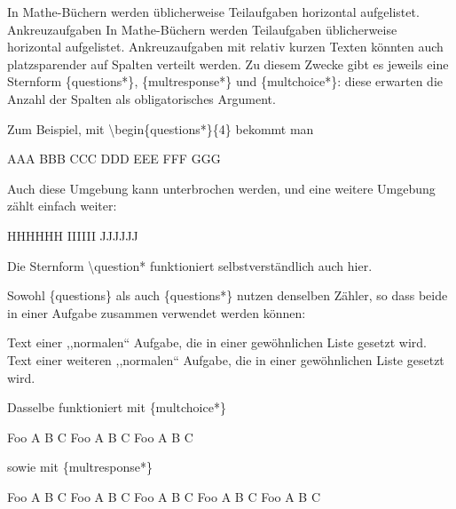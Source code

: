 \documentclass[hyperworksheet]{drcschool}
\newcommand*{\cs}[1]{\textup{\ttfamily\textbackslash#1}}                   %
\newcommand*{\env}[1]{\textup{\ttfamily\{#1\}}}                            %
\begin{document}

\begin{worksheet}

In Mathe-Büchern werden üblicherweise Teilaufgaben horizontal aufgelistet. Ankreuzaufgaben
In Mathe-Büchern werden Teilaufgaben üblicherweise horizontal aufgelistet.
Ankreuzaufgaben mit relativ kurzen Texten könnten auch platzsparender auf
Spalten verteilt werden. Zu diesem Zwecke gibt es jeweils eine Sternform
\env{questions*}, \env{multresponse*} und \env{multchoice*}: diese erwarten
die Anzahl der Spalten als obligatorisches Argument.

Zum Beispiel, mit \cs{begin\{questions*\}\{4\}} bekommt man
\begin{questions*}{4}
\question AAA
\question* BBB
\question CCC
\question* DDD
\question EEE
\question FFF
\question GGG
\end{questions*}
Auch diese Umgebung kann unterbrochen werden, und eine weitere Umgebung
zählt einfach weiter:
\begin{questions*}{3}
\question HHHHHH
\question IIIIII
\question JJJJJJ
\end{questions*}
Die Sternform \cs{question*} funktioniert selbstverständlich auch hier.

Sowohl \env{questions} als auch \env{questions*} nutzen denselben Zähler, so
dass beide in einer Aufgabe zusammen verwendet werden können:
\begin{questions}
\question Text einer ,,normalen`` Aufgabe, die in einer gewöhnlichen Liste gesetzt wird.
\question Text einer weiteren ,,normalen`` Aufgabe, die in einer gewöhnlichen Liste gesetzt wird.
\end{questions}

\exercise[Ankreuzaufgaben]
Dasselbe funktioniert mit \env{multchoice*}
\begin{multchoice*}{3}
\question Foo
   \choice* A
   \choice B
   \choice C
\question Foo
   \choice A
   \choice B
   \choice* C
\question Foo
   \choice A
   \choice* B
   \choice C
\end{multchoice*}
sowie mit \env{multresponse*}
\begin{multresponse*}{3}
\question Foo
   \choice* A
   \choice B
   \choice* C
\question Foo
   \choice A
   \choice B
   \choice* C
\question Foo
   \choice* A
   \choice* B
   \choice C
\question Foo
   \choice A
   \choice* B
   \choice* C
\question Foo
   \choice A
   \choice* B
   \choice C
\end{multresponse*}


\end{worksheet}
\end{document}
